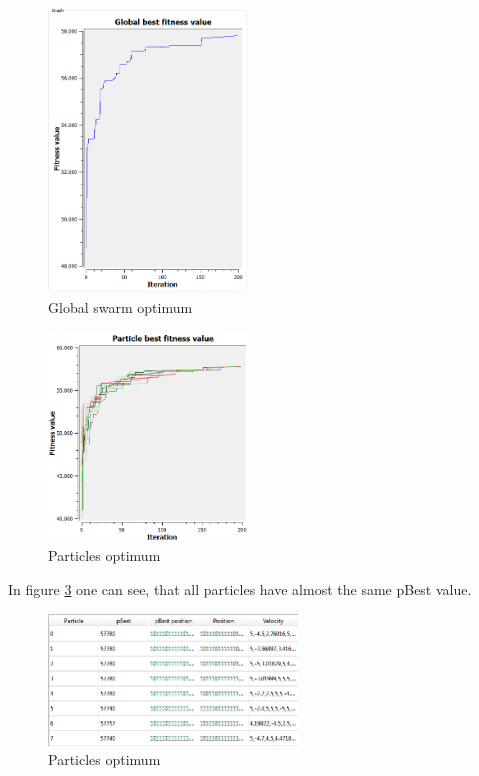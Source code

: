 \documentclass{article}
\begin{document}
\begin{figure}[H]
    \centering
    \includegraphics[width=200px]{images/p30_200it_p1.PNG}
    \caption{Global swarm optimum}
    \label{fig-p30_200it_p1}
\end{figure}

\begin{figure}[H]
    \centering
    \includegraphics[width=200px]{images/p30_200it_p1_particles.PNG}
    \caption{Particles optimum}
    \label{fig-p30_200it_p1_particles}
\end{figure}

In figure \ref{fig-particles_optimum} one can see, that all particles have almost the same pBest value.

\begin{figure}[H]
    \centering
    \includegraphics[width=250px]{images/particles_optimum.PNG}
    \caption{Particles optimum}
    \label{fig-particles_optimum}
\end{figure}
\end{document}
